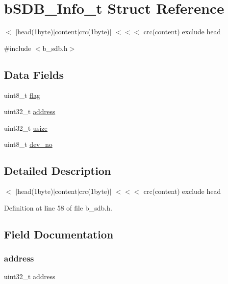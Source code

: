 \hypertarget{structb_s_d_b___info__t}{}\section{b\+S\+D\+B\+\_\+\+Info\+\_\+t Struct Reference}
\label{structb_s_d_b___info__t}


$<$ $\vert$head(1byte)$\vert$content$\vert$crc(1byte)$\vert$ $<$$<$$<$ crc(content) exclude head  




{\ttfamily \#include $<$b\+\_\+sdb.\+h$>$}

\subsection*{Data Fields}
\begin{DoxyCompactItemize}
\item 
uint8\+\_\+t \mbox{\hyperlink{structb_s_d_b___info__t_aff31312fb16705aa73c53b945a1a6b30}{flag}}
\item 
uint32\+\_\+t \mbox{\hyperlink{structb_s_d_b___info__t_ac0d31ca829f934cccd89f8054e02773e}{address}}
\item 
uint32\+\_\+t \mbox{\hyperlink{structb_s_d_b___info__t_a546dee965d95ce52190c06bfb12a5d85}{usize}}
\item 
uint8\+\_\+t \mbox{\hyperlink{structb_s_d_b___info__t_a858e2685fb0034acadcd8d48cf6f02b2}{dev\+\_\+no}}
\end{DoxyCompactItemize}


\subsection{Detailed Description}
$<$ $\vert$head(1byte)$\vert$content$\vert$crc(1byte)$\vert$ $<$$<$$<$ crc(content) exclude head 

Definition at line 58 of file b\+\_\+sdb.\+h.



\subsection{Field Documentation}
\mbox{\label{structb_s_d_b___info__t_ac0d31ca829f934cccd89f8054e02773e}} 
\subsubsection{\texorpdfstring{address}{address}}
{\footnotesize\ttfamily uint32\+\_\+t address}



